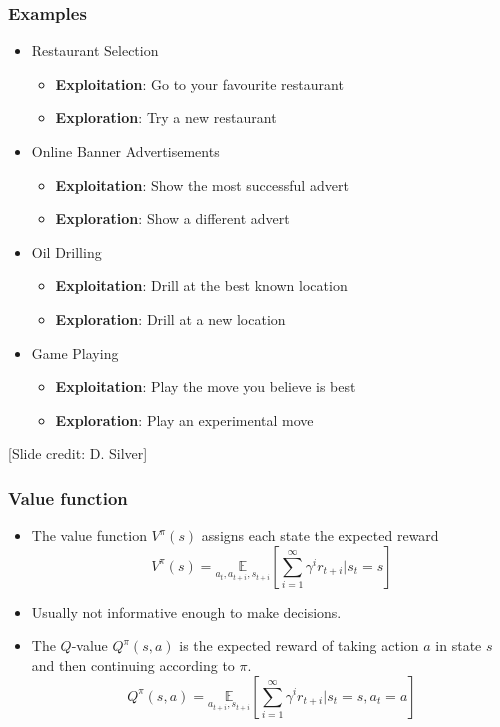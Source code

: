 \documentclass[handout]{beamer}
\renewcommand{\high}{\textbf}
\begin{document}
\begin{frame}\frametitle{Examples}\small
\begin{itemize}
\item Restaurant Selection
\begin{itemize}
\item \high{Exploitation}: Go to your favourite restaurant
\item \high{Exploration}: Try a new restaurant
\end{itemize}
\item Online Banner Advertisements
\begin{itemize}
\item \high{Exploitation}: Show the most successful advert
\item \high{Exploration}: Show a different advert
\end{itemize}
\item Oil Drilling
\begin{itemize}
\item \high{Exploitation}: Drill at the best known location
\item \high{Exploration}: Drill at a new location
\end{itemize}
\item Game Playing
\begin{itemize}
\item \high{Exploitation}: Play the move you believe is best
\item \high{Exploration}: Play an experimental move
\end{itemize}
\end{itemize}
\vspace{1mm}
\scriptsize [Slide credit: D. Silver]
\end{frame}



\begin{frame}\frametitle{Value function}\small
\begin{itemize}
\item The value function $V^\pi(s)$ assigns each state the expected reward 
\[
V^\pi(s)=\underset{a_{t},a_{t+i},s_{t+i}}{\mathbb{E}}\left[\sum_{i=1}^\infty\gamma^{i} r_{t+i} |s_t=s\right]
\]
\item Usually not informative enough to make decisions.
\item The $Q$-value $Q^{\pi}(s,a)$ is the expected reward of taking action $a$ in state $s$ and then continuing according to $\pi$.
\[
Q^\pi(s,a)=\underset{a_{t+i},s_{t+i}}{\mathbb{E}}\left[\sum_{i=1}^\infty\gamma^{i} r_{t+i} |s_t=s,a_t=a\right]
\]
\end{itemize}
\end{frame}
\end{document}
